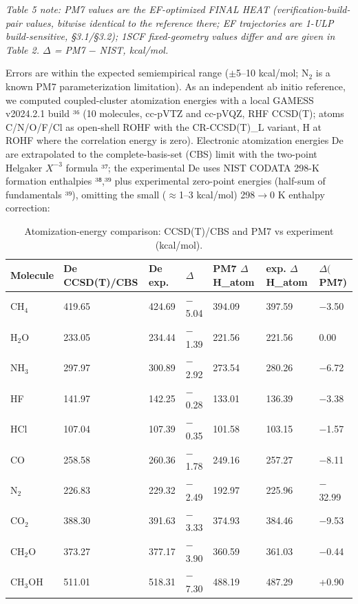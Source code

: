\documentclass[preprint,12pt]{elsarticle}
\begin{document}
\textit{Table 5 note: PM7 values are the EF-optimized FINAL HEAT (verification-build-pair values, bitwise identical to the reference there; EF trajectories are 1-ULP build-sensitive, \S{}3.1/\S{}3.2); 1SCF fixed-geometry values differ and are given in Table 2. $\Delta$ = PM7 $-$ NIST, kcal/mol.}

Errors are within the expected semiempirical range ($\pm$5--10 kcal/mol; N$_{2}$ is a known PM7 parameterization limitation). As an independent ab initio reference, we computed coupled-cluster atomization energies with a local GAMESS v2024.2.1 build ³⁶ (10 molecules, cc-pVTZ and cc-pVQZ, RHF CCSD(T); atoms C/N/O/F/Cl as open-shell ROHF with the CR-CCSD(T)\_L variant, H at ROHF where the correlation energy is zero). Electronic atomization energies De are extrapolated to the complete-basis-set (CBS) limit with the two-point Helgaker $X^{-3}$ formula ³⁷; the experimental De uses NIST CODATA 298-K formation enthalpies ³⁸,³⁹ plus experimental zero-point energies (half-sum of fundamentals ³⁹), omitting the small ($\approx$1--3 kcal/mol) 298$\rightarrow$0 K enthalpy correction:

\begin{table}[htbp]
\centering
\caption{Atomization-energy comparison: CCSD(T)/CBS and PM7 vs experiment (kcal/mol).}
\label{tab:Atomizationenerg}
\begin{tabular}{lllllll}
\hline
\textbf{Molecule} & \textbf{De CCSD(T)/CBS} & \textbf{De exp.} & \textbf{$\Delta$} & \textbf{PM7 $\Delta$H\_atom} & \textbf{exp. $\Delta$H\_atom} & \textbf{$\Delta($PM7)} \\
\hline
CH$_{4}$ & 419.65 & 424.69 & $-$5.04 & 394.09 & 397.59 & $-$3.50 \\
H$_{2}$O & 233.05 & 234.44 & $-$1.39 & 221.56 & 221.56 & 0.00 \\
NH$_{3}$ & 297.97 & 300.89 & $-$2.92 & 273.54 & 280.26 & $-$6.72 \\
HF & 141.97 & 142.25 & $-$0.28 & 133.01 & 136.39 & $-$3.38 \\
HCl & 107.04 & 107.39 & $-$0.35 & 101.58 & 103.15 & $-$1.57 \\
CO & 258.58 & 260.36 & $-$1.78 & 249.16 & 257.27 & $-$8.11 \\
N$_{2}$ & 226.83 & 229.32 & $-$2.49 & 192.97 & 225.96 & $-$32.99 \\
CO$_{2}$ & 388.30 & 391.63 & $-$3.33 & 374.93 & 384.46 & $-$9.53 \\
CH$_{2}$O & 373.27 & 377.17 & $-$3.90 & 360.59 & 361.03 & $-$0.44 \\
CH$_{3}$OH & 511.01 & 518.31 & $-$7.30 & 488.19 & 487.29 & +0.90 \\
\hline
\end{tabular}
\end{table}
\end{document}
